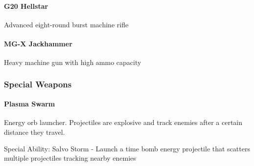 \documentclass[../Main.tex]{subfiles}
\begin{document}
\paragraph{G20 Hellstar}

Advanced eight-round burst machine rifle

\paragraph{MG-X Jackhammer}

Heavy machine gun with high ammo capacity

\subsubsection{Special Weapons}

\paragraph{Plasma Swarm}

Energy orb launcher. Projectiles are explosive and track enemies after a certain distance they travel. 

Special Ability: Salvo Storm - Launch a time bomb energy projectile that scatters multiple projectiles tracking nearby enemies
\end{document}
